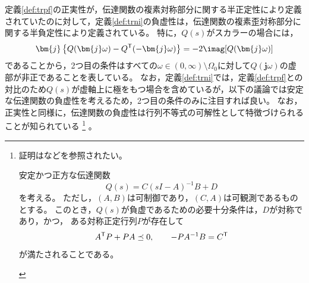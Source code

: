 \documentclass[tombow,dvipdfmx]{corona-a5-1.1}
\begin{document}
定義\ref{def:trpf}の正実性が，伝達関数の複素対称部分に関する半正定性により定義されていたのに対して，定義\ref{def:trni}の負虚性は，伝達関数の複素歪対称部分に関する半負定性により定義されている。
特に，$Q(s)$がスカラーの場合には，
\begin{align*}
\bm{j}\left\{Q(\bm{j} \omega) - Q^{\sf T}(-\bm{j} \omega) \right\}
= -2 \imag[Q(\bm{j} \omega)]
\end{align*}
であることから，2つ目の条件はすべての$\omega \in (0,\infty)\setminus \Omega_0$に対して$Q(\bm{j}\omega)$の虚部が非正であることを表している。
なお，定義\ref{def:trni}では，定義\ref{def:trpf}との対比のため$Q(s)$が虚軸上に極をもつ場合を含めているが，以下の議論では安定な伝達関数の負虚性を考えるため，2つ目の条件のみに注目すれば良い。
なお，正実性と同様に，伝達関数の負虚性は行列不等式の可解性として特徴づけられることが知られている
\footnote{
証明は\cite[Lemma 7]{xiong2010negative}などを参照されたい。
\begin{補題*}
安定かつ正方な伝達関数
\[
Q(s)=C(sI-A)^{-1}B + D
\]
を考える。
ただし，$(A,B)$は可制御であり，$(C,A)$は可観測であるものとする。
このとき，$Q(s)$が負虚であるための必要十分条件は，$D$が対称であり，かつ，
ある対称正定行列$P$が存在して
\begin{align*}
A^{\sf T}P+PA \preceq 0
,\qquad
-PA^{-1}B = C^{\sf T}
\end{align*}
が満たされることである。
\end{補題*}
}
。
\end{document}
